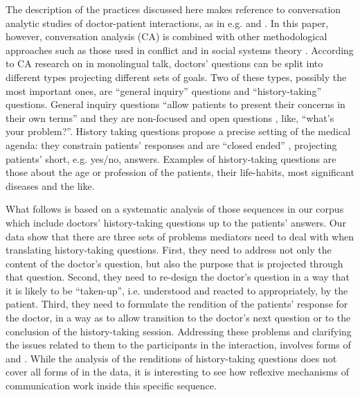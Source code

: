 \documentclass[output=paper]{LSP/langsci}
\begin{document}
The description of the practices discussed here makes reference to conversation analytic studies of doctor-patient interactions, as in e.g. \citet[51--169]{Heritage2010} and \citet{Heritage2006Communication}. In this paper, however, conversation analysis (CA) is combined with other methodological approaches such as those used in conflict  \citep{Bush1994, Winslade2008} and in social systems theory \citep{Luhmann1984}. According to CA research on  in monolingual talk, doctors' questions can be split into different types \citep{Heritage2006The} projecting different sets of goals. Two of these types, possibly the most important ones, are ``general inquiry'' questions and ``history-taking'' questions. General inquiry questions ``allow patients to present their concerns in their own terms'' \citep[92]{Heritage2006The} and they are non-focused and open questions \citep{Robinson2001Closing}, like, ``what's your problem?''. History taking questions propose a precise setting of the medical agenda: they constrain patients' responses and are ``closed ended'' \citep[97]{Heritage2006The}, projecting patients' short, e.g. yes/no, answers. Examples of history-taking questions are those about the age or profession of the patients, their life-habits, most significant diseases and the like.

What follows is based on a systematic analysis of those sequences in our corpus which include doctors' history-taking questions up to the patients' answers. Our data show that there are three sets of problems mediators need to deal with when translating history-taking questions. First, they need to address not only the content of the doctor's question, but also the purpose that is projected through that question. Second, they need to re-design the doctor's question in a way that it is likely to be ``taken-up'', i.e. understood and reacted to appropriately, by the patient. Third, they need to formulate the rendition of the patients' response for the doctor, in a way as to allow transition to the doctor's next question or to the conclusion of the history-taking session. Addressing these problems and clarifying the issues related to them to the participants in the interaction, involves forms of  and . While the analysis of the renditions of history-taking questions does not cover all  forms of  in the data, it is interesting to see how reflexive mechanisms of communication work inside this specific sequence. 
\end{document}
